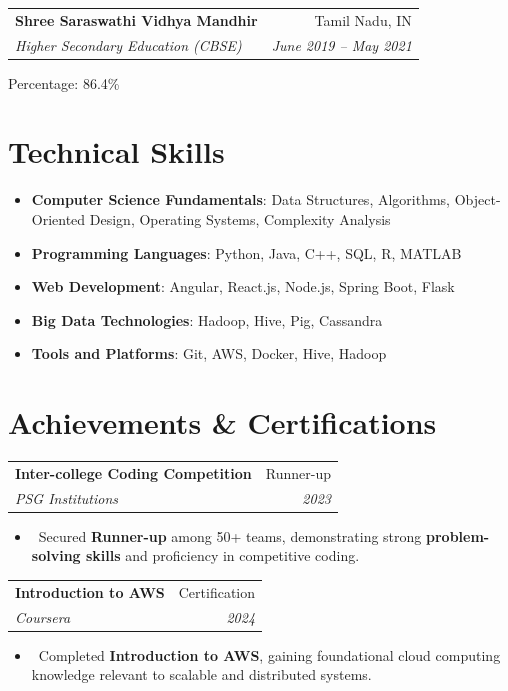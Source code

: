 \documentclass[letterpaper,11pt]{article}
\makeatletter
\newcommand{\resumeItem}[1]{\item\small{#1}}
\newcommand{\resumeSubheading}[4]{%
  \vspace{-1pt}\item
  \begin{tabular*}{0.97\textwidth}[t]{l@{\extracolsep{\fill}}r}
    \textbf{#1} & #2 \\
    \textit{#3} & \textit{#4} \\
  \end{tabular*}\vspace{-7pt}
}
\newcommand{\resumeSubHeadingList}{\begin{itemize}[leftmargin=0.15in, label={}]}
\newcommand{\resumeSubHeadingListEnd}{\end{itemize}}
\makeatother
\begin{document}
\resumeSubheading{Shree Saraswathi Vidhya Mandhir}{Tamil Nadu, IN}{Higher Secondary Education (CBSE)}{June 2019 -- May 2021}  
\resumeItem{Percentage: 86.4\%}
\section{Technical Skills}
\resumeSubHeadingList
  \resumeItem{\textbf{Computer Science Fundamentals}: Data Structures, Algorithms, Object-Oriented Design, Operating Systems, Complexity Analysis}
  \resumeItem{\textbf{Programming Languages}: Python, Java, C++, SQL, R, MATLAB}

  \resumeItem{\textbf{Web Development}: Angular, React.js, Node.js, Spring Boot, Flask}
  \resumeItem{\textbf{Big Data Technologies}: Hadoop, Hive, Pig, Cassandra}
  \resumeItem{\textbf{Tools and Platforms}: Git, AWS, Docker, Hive, Hadoop}
\resumeSubHeadingListEnd

\section{Achievements \& Certifications}
\resumeSubheading{Inter-college Coding Competition}{Runner-up}{PSG Institutions}{2023}
\resumeSubHeadingList
  \resumeItem{\textbullet\ Secured \textbf{Runner-up} among 50+ teams, demonstrating strong \textbf{problem-solving skills} and proficiency in competitive coding.}
\resumeSubHeadingListEnd

\resumeSubheading{Introduction to AWS}{Certification}{Coursera}{2024}
\resumeSubHeadingList
  \resumeItem{\textbullet\ Completed \textbf{Introduction to AWS}, gaining foundational cloud computing knowledge relevant to scalable and distributed systems.}
\resumeSubHeadingListEnd
\end{document}
